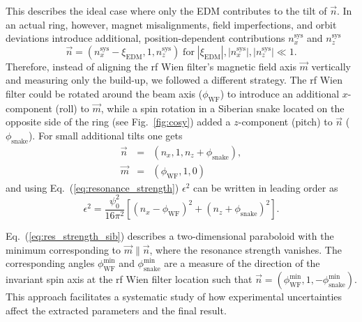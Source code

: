 \documentclass[
    10pt,
    twocolumn,
    secnumarabic,
    amssymb,
    nobibnotes,
    aps,
    prl,

    longbibliography,
    superscriptaddress
    ]{revtex4-2}
\newcommand{\xiedm}{\xi_{\text{EDM}}}
\begin{document}
This describes the ideal case where only the EDM contributes to the tilt of $\vec{n}$. In an actual ring, however, magnet misalignments, field imperfections, and orbit deviations introduce additional, position-dependent contributions $n_x^\mathrm{sys}$ and $n_z^\mathrm{sys}$
\begin{equation}
\vec n=\left(n_x^\mathrm{sys}-\xiedm,1,n_z^\mathrm{sys}\right) \;\mathrm{for}\; |\xiedm|,|n_x^\mathrm{sys}|,|n_z^\mathrm{sys}|\ll 1.
\end{equation}
Therefore, instead of aligning the rf Wien filter’s magnetic field axis $\vec{m}$ vertically and measuring only the build-up, we followed a different strategy.
The rf Wien filter could be rotated around the beam axis ($\phi_{\text{WF}}$) to introduce an additional $x$-component (roll) to $\vec{m}$, while a spin rotation in a Siberian snake located on the opposite side of the ring (see Fig.~\ref{fig:cosy}) added a $z$-component (pitch) to $\vec{n}$ ($\phi_\mathrm{snake}$).
For small additional tilts one gets
\begin{eqnarray}
\vec{n} &=& (n_x, 1, n_z + \phi_\mathrm{snake}), \\
\vec{m} &=& (\phi_\mathrm{WF}, 1, 0)
\end{eqnarray}
and using Eq.~(\ref{eq:resonance_strength}) $\epsilon^2$ can be written in leading order as
\begin{equation}
  \epsilon^2 = \frac{\psi_0^2}{16\pi^2}\left[\left(n_x-\phi_{\text{WF}}\right)^{2}+\left(n_z + \phi_\mathrm{snake}\right)^{2}\right]. \label{eq:res_strength_sib}
\end{equation}

Eq.~(\ref{eq:res_strength_sib}) describes a two-dimensional paraboloid with the minimum corresponding to
$\vec{m}\parallel\vec{n}$, where the resonance strength vanishes. The corresponding angles $\phi_{\text{WF}}^{\text{min}}$ and $\phi_\mathrm{snake}^{\text{min}}$ are a measure of the direction of the invariant spin axis at the rf Wien filter location such that $\vec{n} = (\phi_{\text{WF}}^{\text{min}},1,-\phi_\mathrm{snake}^{\text{min}})$.
This approach facilitates a systematic study of how experimental uncertainties affect the extracted parameters and the final result.
\end{document}
